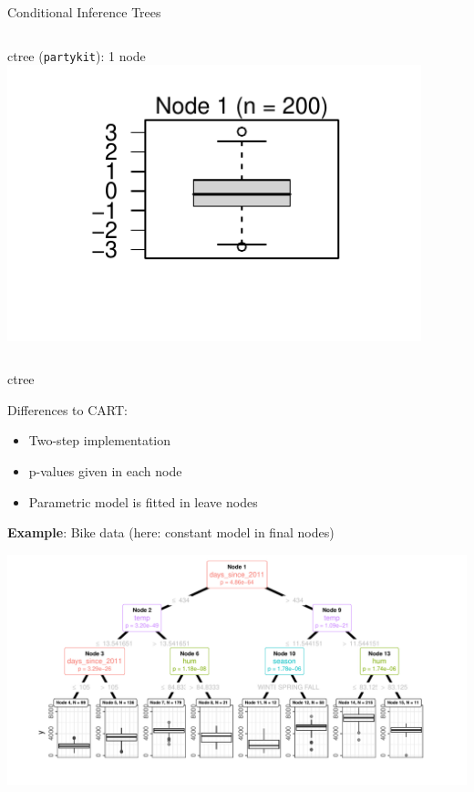 \documentclass[11pt,compress,t,notes=noshow, aspectratio=169, xcolor=table]{beamer}
\begin{document}
\begin{frame}{Conditional Inference Trees}
\begin{columns}[T, totalwidth = \linewidth]
\begin{column}{0.4\textwidth}
        \begin{center}
        \scriptsize{ctree (\texttt{partykit}): 1 node}
        \vspace{-0.2cm}
        \includegraphics[width = 0.9\textwidth]{figure/selection_bias_simulation_ctree.pdf}
        \end{center}
    \end{column}
\end{columns}

\end{frame}


\begin{frame}{ctree}

\vspace{-0.1cm}
Differences to CART:
\begin{itemize}
    \item Two-step implementation 
    \item p-values given in each node
    \item Parametric model is fitted in leave nodes %
\end{itemize}

\medskip

\textbf{Example}: Bike data (here: constant model in final nodes)

\centering
\includegraphics[width = .8\textwidth]{figure/bike_ctree.pdf}
\end{frame}
\end{document}
